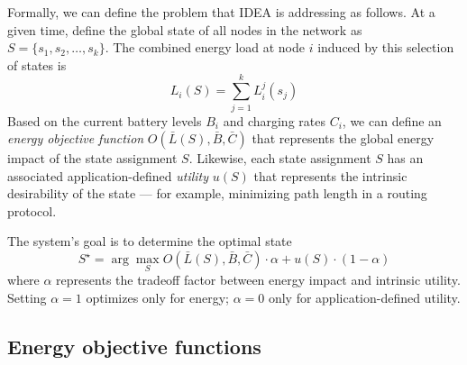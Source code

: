 Formally, we can define the problem that IDEA is addressing as
follows. At a given time, define the global state of all nodes
in the network as $S = \{ s_1, s_2, \ldots, s_k \}$.
The combined energy load at node $i$ induced by this selection of
states is
\[ L_i(S) = \sum_{j=1}^k L_i^j(s_j) \]
Based on the current
battery levels $B_i$ and charging rates $C_i$, we can define an 
{\em energy objective function} $O(\bar{L}(S), \bar{B}, \bar{C})$ that represents
the global energy impact of the state assignment $S$.
Likewise, each state assignment $S$ has an associated 
application-defined {\em utility} $u(S)$ that represents the
intrinsic desirability of the state --- for example, minimizing path
length in a routing protocol. 

The system's goal is to determine the optimal state 
\[
S^\star = \arg \max_{S} O(\bar{L}(S), \bar{B}, \bar{C}) \cdot \alpha + u(S) \cdot (1-\alpha)\]
where $\alpha$ represents the tradeoff factor between energy impact and
intrinsic utility. Setting $\alpha=1$ optimizes only for energy;
$\alpha=0$ only for application-defined utility.

\subsection{Energy objective functions}
\label{idea-subsec-energyobjectivefunctions}

